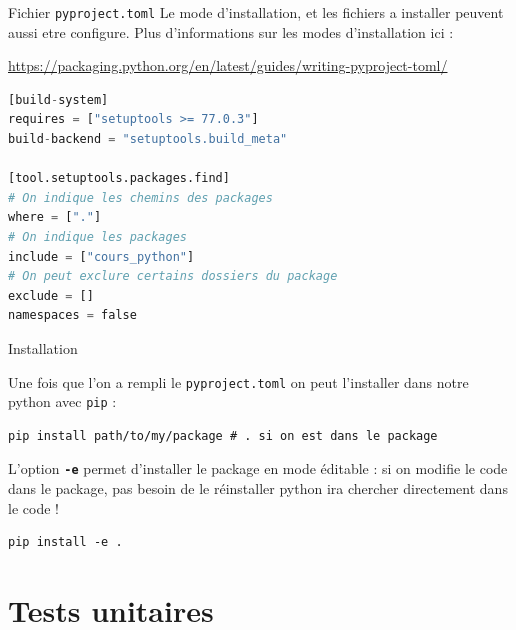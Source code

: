 \documentclass[10pt]{beamer}
\begin{document}
\begin{frame}[fragile]{Fichier \texttt{pyproject.toml}}
  Le mode d'installation, et les fichiers a installer peuvent aussi etre configure.  
  Plus d'informations sur les modes d'installation ici :  


  \footnotesize\textcolor{blue}{\url{https://packaging.python.org/en/latest/guides/writing-pyproject-toml/}}



  \begin{lstlisting}[language=python, numbers=none]
[build-system]
requires = ["setuptools >= 77.0.3"]
build-backend = "setuptools.build_meta"

[tool.setuptools.packages.find]
# On indique les chemins des packages
where = ["."]
# On indique les packages
include = ["cours_python"]
# On peut exclure certains dossiers du package
exclude = []
namespaces = false
  \end{lstlisting}

\end{frame}

\begin{frame}[fragile]{Installation}

Une fois que l'on a rempli le \texttt{pyproject.toml} on peut l'installer 
dans notre python avec \texttt{pip} :

\begin{lstlisting}[numbers=none]
pip install path/to/my/package # . si on est dans le package
\end{lstlisting}

L'option \textbf{\texttt{-e}} permet d'installer le package en mode
éditable : si on modifie le code dans le package, pas besoin de le réinstaller
python ira chercher directement dans le code !

\begin{lstlisting}[numbers=none]
pip install -e .
\end{lstlisting}

\end{frame}


\section{Tests unitaires}
\end{document}
